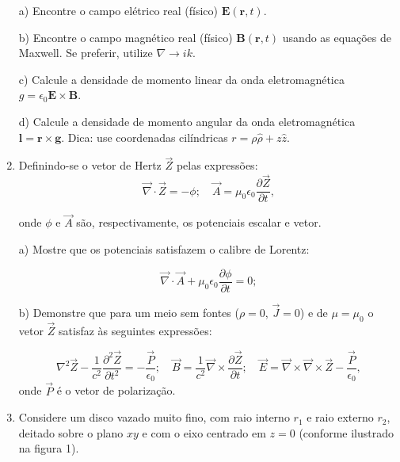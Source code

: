 \begin{enumerate}[start=1,label={\bfseries Q\arabic*.}]
a) Encontre o campo elétrico real (físico) $\mathbf{E}(\mathbf{r},t)$.

\resposta

b) Encontre o campo magnético real (físico) $\mathbf{B}(\mathbf{r},t)$ usando as equações de Maxwell. Se preferir, utilize $\nabla \rightarrow ik$.

\resposta

c) Calcule a densidade de momento linear da onda eletromagnética $g = \epsilon_{0} \mathbf{E} \times \mathbf{B}$.

\resposta

d) Calcule a densidade de momento angular da onda eletromagnética $\mathbf{l} = \mathbf{r} \times \mathbf{g}$. Dica: use coordenadas cilíndricas $r = \rho \hat{\rho} + z \hat{z}$.



\item Definindo-se o vetor de Hertz $\vec{Z}$ pelas expressões:
\begin{equation}
\vec{\nabla} \cdot \vec{Z} = -\phi; \quad \vec{A} = \mu_{0} \epsilon_{0} \frac{\partial \vec{Z}}{\partial t},
\end{equation}

onde $\phi$ e $\vec{A}$ são, respectivamente, os potenciais escalar e vetor.


a) Mostre que os potenciais satisfazem o calibre de Lorentz:

\begin{equation}
\vec{\nabla} \cdot \vec{A} + \mu_{0} \epsilon_{0} \frac{\partial \phi}{\partial t} = 0;
\end{equation}

\resposta

b) Demonstre que para um meio sem fontes ($\rho = 0$, $\vec{J} = 0$) e de $\mu = \mu_{0}$ o vetor $\vec{Z}$ satisfaz às seguintes expressões:

\begin{equation}
\nabla^{2} \vec{Z} - \frac{1}{c^{2}} \frac{\partial^{2} \vec{Z}}{\partial t^{2}} = - \frac{\vec{P}}{\epsilon_{0}}; \quad
\vec{B} = \frac{1}{c^{2}} \vec{\nabla} \times \frac{\partial \vec{Z}}{\partial t}; \quad \vec{E} = \vec{\nabla} \times \vec{\nabla} \times \vec{Z} - \frac{\vec{P}}{\epsilon_{0}},
\end{equation}
onde $\vec{P}$ é o vetor de polarização.

\resposta

\item Considere um disco vazado muito fino, com raio interno $r_{1}$ e raio externo $r_{2}$, deitado sobre o plano $xy$ e com o eixo centrado em $z = 0$ (conforme ilustrado na figura 1).


\end{enumerate}
